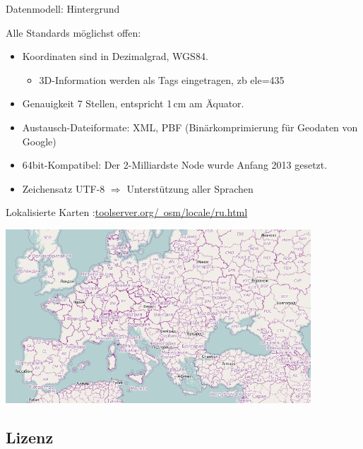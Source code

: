 \documentclass[handout]{beamer}
\begin{document}
\begin{frame}{Datenmodell: Hintergrund}

Alle Standards möglichst offen:

\begin{itemize}
  \item Koordinaten sind in Dezimalgrad, WGS84.
  \begin{itemize}
  \item 3D-Information werden als Tags eingetragen, zb ele=435
\end{itemize}
  \item Genauigkeit 7 Stellen, entspricht 1\,cm am Äquator.
  \item Austausch-Dateiformate: XML, PBF (Binärkomprimierung für Geodaten von Google)
  \item 64bit-Kompatibel: Der 2-Milliardste Node wurde Anfang 2013 gesetzt.
\pause
  \item Zeichensatz UTF-8 $\Rightarrow$ Unterstützung aller Sprachen
\end{itemize}

\end{frame}

\begin{frame}{Lokalisierte Karten :\hfill\href{http://toolserver.org/~osm/locale/ru.html}{toolserver.org/~osm/locale/ru.html}}
\begin{center}
\vspace{-1cm}
\includegraphics[height=6.5cm]{style-russ.png}
\end{center}
\end{frame}

\hypersetup{urlcolor=blue}


\subsection{Lizenz}
\end{document}

